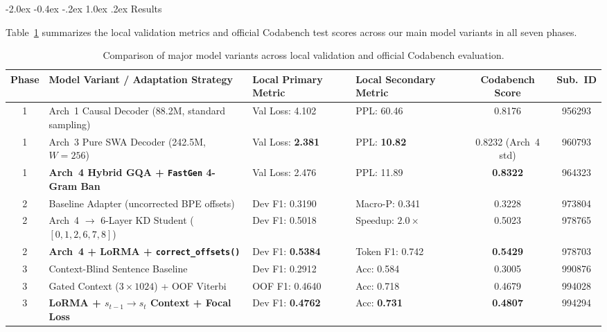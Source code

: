 \documentclass[11pt, oneside]{article}
\makeatletter
\renewcommand\section{\@startsection {section}{1}{\z@}%
  {-2.0ex \@plus -0.4ex \@minus -.2ex}%
  {1.0ex \@plus.2ex}%
  {\normalfont\Large\bfseries}}
\makeatother
\begin{document}
\section{Results}

Table~\ref{tab:variants} summarizes the local validation metrics and official Codabench test scores across our main model variants in all seven phases.

\begin{table}[t]
\centering
\scriptsize
\setlength{\tabcolsep}{3.0pt}
\renewcommand{\arraystretch}{0.84}
\caption{Comparison of major model variants across local validation and official Codabench evaluation.}
\label{tab:variants}
\begin{adjustbox}{width=\textwidth}
\begin{tabular}{@{}clllcc@{}}
\toprule
\textbf{Phase} & \textbf{Model Variant / Adaptation Strategy} & \textbf{Local Primary Metric} & \textbf{Local Secondary Metric} & \textbf{Codabench Score} & \textbf{Sub.\ ID} \\
\midrule
1 & Arch~1 Causal Decoder (88.2M, standard sampling) & Val Loss: 4.102 & PPL: 60.46 & 0.8176 & 956293 \\
1 & Arch~3 Pure SWA Decoder (242.5M, $W=256$) & Val Loss: \textbf{2.381} & PPL: \textbf{10.82} & 0.8232 (Arch~4 std) & 960793 \\
1 & \textbf{Arch~4 Hybrid GQA + \texttt{FastGen} 4-Gram Ban} & Val Loss: 2.476 & PPL: 11.89 & \textbf{0.8322} & 964323 \\
\midrule
2 & Baseline Adapter (uncorrected BPE offsets) & Dev F1: 0.3190 & Macro-P: 0.341 & 0.3228 & 973804 \\
2 & Arch~4 $\to$ 6-Layer KD Student ($[0,1,2,6,7,8]$) & Dev F1: 0.5018 & Speedup: $2.0\times$ & 0.5023 & 978765 \\
2 & \textbf{Arch~4 + LoRMA + \texttt{correct\_offsets()}} & Dev F1: \textbf{0.5384} & Token F1: 0.742 & \textbf{0.5429} & 978703 \\
\midrule
3 & Context-Blind Sentence Baseline & Dev F1: 0.2912 & Acc: 0.584 & 0.3005 & 990876 \\
3 & Gated Context ($3\times 1024$) + OOF Viterbi & OOF F1: 0.4640 & Acc: 0.718 & 0.4679 & 994028 \\
3 & \textbf{LoRMA + $s_{t-1}\to s_t$ Context + Focal Loss} & Dev F1: \textbf{0.4762} & Acc: \textbf{0.731} & \textbf{0.4807} & 994294 \\
\midrule

\end{tabular}
\end{adjustbox}
\end{table}
\end{document}
